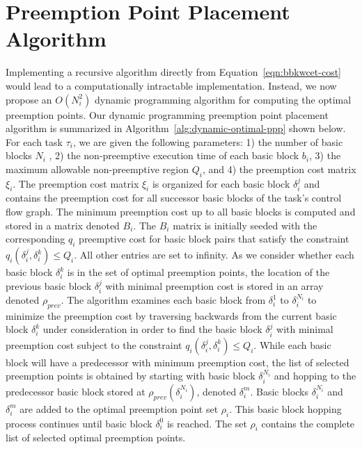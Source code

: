 \vspace{-5pt}
\section{Preemption Point Placement Algorithm}\label{sec:implementation}

 Implementing a recursive algorithm directly from Equation~\ref{eqn:bbkwcet-cost} would lead to a computationally intractable implementation.  Instead, we now propose an \begin{math}O(N_i^{2})\end{math} dynamic programming algorithm for computing the optimal preemption points.  Our dynamic programming preemption point placement algorithm is summarized in Algorithm~\ref{alg:dynamic-optimal-ppp} shown below.  For each task $\tau_i$, we are given the following parameters: 1) the number of basic blocks $N_i$ , 2) the non-preemptive execution time of each basic block $b_i$, 3) the maximum allowable non-preemptive region $Q_i$, and 4) the preemption cost matrix $\xi_i$.  The preemption cost matrix $\xi_i$ is organized for each basic block \begin{math}\delta_{i}^{j}\end{math} and contains the preemption cost for all successor basic blocks of the task's control flow graph.  The minimum preemption cost up to all basic blocks is computed and stored in a matrix denoted $B_{i}$.  The $B_{i}$ matrix is initially seeded with the corresponding $q_i$ preemptive cost for basic block pairs that satisfy the constraint $q_{i}(\delta_{i}^{j},\delta_{i}^{k}) \leq Q_{i}$. All other entries are set to infinity.  As we consider whether each basic block $\delta_{i}^{k}$ is in the set of optimal preemption points, the location of the previous basic block $\delta_{i}^{j}$ with minimal preemption cost is stored in an array denoted $\rho_{prev}$.  The algorithm examines each basic block from \begin{math}\delta_{i}^{1}\end{math} to \begin{math}\delta_{i}^{N_i}\end{math} to minimize the preemption cost by traversing backwards from the current basic block $\delta_{i}^{k}$ under consideration in order to find the basic block $\delta_{i}^{j}$ with minimal preemption cost subject to the constraint $q_{i}(\delta_{i}^{j},\delta_{i}^{k}) \leq Q_{i}$.  While each basic block will have a predecessor with minimum preemption cost, the list of selected preemption points is obtained by starting with basic block $\delta_{i}^{N_i}$ and hopping to the predecessor basic block stored at $\rho_{prev}(\delta_{i}^{N_i})$, denoted $\delta_{i}^{m}$.  Basic blocks $\delta_{i}^{N_i}$ and $\delta_{i}^{m}$ are added to the optimal preemption point set $\rho_{i}$.  This basic block hopping process continues until basic block $\delta_{i}^{0}$ is reached.  The set $\rho_{i}$ contains the complete list of selected optimal preemption points.
